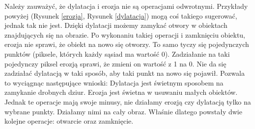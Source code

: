 \documentclass{article}
\begin{document}
        {
            \Large
            \justifying
            \quad
            Należy zauważyć, że dylatacja i erozja nie są operacjami odwrotnymi.
            Przykłady powyżej (Rysunek \ref{erozja}, Rysunek \ref{dylatacja}) mogą coś takiego sugerować, jednak tak nie jest.
            Dzięki dylatacji możemy zamykać otwory w obiektach znajdujących się na obrazie.
            Po wykonaniu takiej operacji i zamknięciu obiektu, erozja nie sprawi, że obiekt na nowo się otworzy.
            To samo tyczy się pojedynczych punktów (piksele, których każdy sąsiad ma wartość 0).
            Zadziałanie na taki pojedynczy piksel erozją sprawi, że zmieni on wartość z 1 na 0.
            Nie da się zadziałać dylatacją w taki sposób, aby taki punkt na nowo się pojawił.
            Pozwala to wyciągnąc następujące wnioski:
            Dylatacja jest świetnym sposobem na zamykanie drobnych dziur.
            Erozja jest świetna w usuwaniu małych obiektów.
            Jednak te operacje mają swoje minusy, nie działamy erozją czy dylatacją tylko na wybrane punkty.
            Działamy nimi na cały obraz.
            Właśnie dlatego powstały dwie kolejne operacje: otwarcie oraz zamknięcie.
        }
\end{document}
